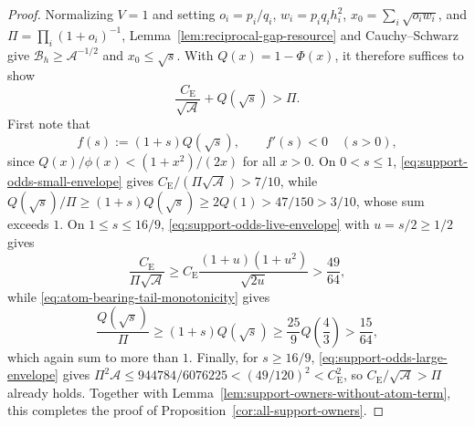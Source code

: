 \documentclass[11pt]{article}
\numberwithin{equation}{section}
\theoremstyle{definition}
\theoremstyle{remark}
\newcommand{\be}{C_{\mathrm E}}
\newcommand{\ph}{\phi}
\begin{document}
\begin{proof}
Normalizing $V=1$ and setting $o_i=p_i/q_i$, $w_i=p_iq_ih_i^2$, $x_0=\sum_i\sqrt{o_iw_i}$,
and $\Pi=\prod_i(1+o_i)^{-1}$, Lemma~\ref{lem:reciprocal-gap-resource} and
Cauchy--Schwarz give $\mathcal B_h\ge\mathcal A^{-1/2}$ and $x_0\le\sqrt s$.
With $Q(x)=1-\Phi(x)$, it therefore suffices to show
\begin{equation}
 \frac{\be}{\sqrt{\mathcal A}}+Q(\sqrt s)>\Pi.
\label{eq:atom-bearing-weights-free-target}
\end{equation}
First note that
\begin{equation}
 f(s):=(1+s)Q(\sqrt s),\qquad f'(s)<0\quad(s>0),
\label{eq:atom-bearing-tail-monotonicity}
\end{equation}
since $Q(x)/\ph(x)<(1+x^2)/(2x)$ for all $x>0$. On $0<s\le1$,
\eqref{eq:support-odds-small-envelope} gives $\be/(\Pi\sqrt{\mathcal A})>7/10$,
while $Q(\sqrt s)/\Pi\ge(1+s)Q(\sqrt s)\ge2Q(1)>47/150>3/10$, whose sum
exceeds $1$. On $1\le s\le16/9$, \eqref{eq:support-odds-live-envelope} with
$u=s/2\ge1/2$ gives
\begin{equation}
 \frac{\be}{\Pi\sqrt{\mathcal A}}
 \geq\be\frac{(1+u)(1+u^2)}{\sqrt{2u}}
 >\frac{49}{64},
\label{eq:atom-bearing-live-resource-payment}
\end{equation}
while \eqref{eq:atom-bearing-tail-monotonicity} gives
\begin{equation}
 \frac{Q(\sqrt s)}\Pi\geq(1+s)Q(\sqrt s)\ge\frac{25}{9}Q\!\left(\frac43\right)>\frac{15}{64},
\label{eq:atom-bearing-live-tail-payment}
\end{equation}
which again sum to more than $1$. Finally, for $s\ge16/9$,
\eqref{eq:support-odds-large-envelope} gives
$\Pi^2\mathcal A\le944784/6076225<(49/120)^2<\be^2$, so $\be/\sqrt{\mathcal A}>\Pi$
already holds. Together with Lemma~\ref{lem:support-owners-without-atom-term},
this completes the proof of Proposition~\ref{cor:all-support-owners}.
\end{proof}



{\raggedright}
\end{document}

